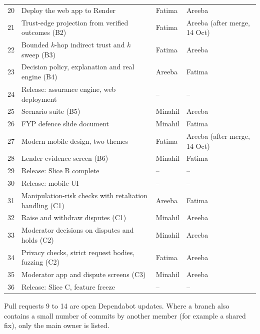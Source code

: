 \begin{longtable}{@{}L{20pt}L{195pt}L{81pt}L{69pt}@{}}
20 & Deploy the web app to Render & Fatima & Areeba \\
21 & Trust-edge projection from verified outcomes (B2) & Fatima & Areeba (after merge, 14 Oct) \\
22 & Bounded $k$-hop indirect trust and $k$ sweep (B3) & Fatima & Areeba \\
23 & Decision policy, explanation and real engine (B4) & Areeba & Fatima \\
24 & Release: assurance engine, web deployment & -- & -- \\
25 & Scenario suite (B5) & Minahil & Areeba \\
26 & FYP defence slide document & Minahil & Fatima \\
27 & Modern mobile design, two themes & Fatima & Areeba (after merge, 14 Oct) \\
28 & Lender evidence screen (B6) & Minahil & Fatima \\
29 & Release: Slice B complete & -- & -- \\
30 & Release: mobile UI & -- & -- \\
31 & Manipulation-risk checks with retaliation handling (C1) & Areeba & Fatima \\
32 & Raise and withdraw disputes (C1) & Minahil & Areeba \\
33 & Moderator decisions on disputes and holds (C2) & Minahil & Areeba \\
34 & Privacy checks, strict request bodies, fuzzing (C2) & Fatima & Areeba \\
35 & Moderator app and dispute screens (C3) & Minahil & Areeba \\
36 & Release: Slice C, feature freeze & -- & -- \\
\end{longtable}
\endgroup
Pull requests 9 to 14 are open Dependabot updates. Where a branch also contains a small number of commits by another member (for example a shared fix), only the main owner is listed.
